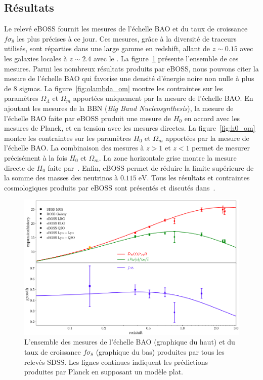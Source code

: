 \subsection{Résultats}
Le relevé eBOSS fournit les mesures de l'échelle BAO et du taux de croissance $f \sigma_8$ les plus précises à ce jour. Ces mesures, grâce à la diversité de traceurs utilisés, sont réparties dans une large gamme en redshift, allant de $z \sim 0.15$ avec les galaxies locales à $z \sim 2.4$ avec le \lya{}.
La figure~\ref{fig:exp_hist} présente l'ensemble de ces mesures.
Parmi les nombreux résultats produits par eBOSS, nous pouvons citer la mesure de l'échelle BAO qui favorise une densité d'énergie noire non nulle à plus de 8 sigmas. %
La figure~\ref{fig:olambda_om} montre les contraintes sur les paramètres $\Omega_{\Lambda}$ et $\Omega_{m}$ apportées uniquement par la mesure de l'échelle BAO.
En ajoutant les mesures de la BBN (\emph{Big Band Nucleosynthesis}), la mesure de l'échelle BAO faite par eBOSS produit une mesure de $H_0$ en accord avec les mesures de Planck, et en tension avec les mesures directes.
La figure~\ref{fig:h0_om} montre les contraintes sur les paramètres $H_0$ et $\Omega_{m}$ apportées par la mesure de l'échelle BAO. La combinaison des mesures à $z > 1$ et $z < 1$ permet de mesurer précisément à la fois $H_0$ et $\Omega_{m}$. La zone horizontale grise montre la mesure directe de $H_0$ faite par~\textcite{Riess2019}.
Enfin, eBOSS permet de réduire la limite supérieure de la somme des masses des neutrinos à $\num{0.115}\; \mathrm{eV}$.
Tous les résultats et contraintes cosmologiques produits par eBOSS sont présentés et discutés dans~\textcite{EBOSSCollaboration2020}.


\begin{figure}
  \centering
  \includegraphics[scale=0.42]{exp_history}
  \caption{L'ensemble des mesures de l'échelle BAO (graphique du haut) et du taux de croissance $f \sigma_8$ (graphique du bas) produites par tous les relevés SDSS. Les lignes continues indiquent les prédictions produites par Planck en supposant un modèle \lcdm{} plat.}
  \label{fig:exp_hist}
\end{figure}

